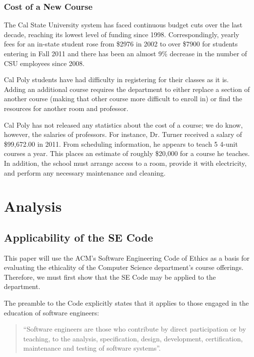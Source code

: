 \documentclass[11pt]{article}
\begin{document}
\begin{multicols}{2}
\subsubsection{Cost of a New Course}

The Cal State University system has faced continuous budget cuts over the last decade, reaching its lowest level of funding since 1998. \cite{tuitonFall}  Correspondingly, yearly fees for an in-state student rose from \$2976 in 2002 to over \$7900 for students entering in Fall 2011 \cite{feeHistory} and there has been an almost 9\% decrease in the number of CSU employees since 2008. \cite{tuitonFall}

Cal Poly students have had difficulty in registering for their classes as it is. \cite{scramble}  Adding an additional course requires the department to either replace a section of another course (making that other course more difficult to enroll in) or find the resources for another room and professor.

Cal Poly has not released any statistics about the cost of a course; we do know, however, the salaries of professors.  For instance, Dr. Turner received a salary of \$99,672.00 in 2011. \cite{sacbee}  From scheduling information, he appears to teach 5 4-unit courses a year. \cite{TurnerSchedule}  This places an estimate of roughly \$20,000 for a course he teaches.  In addition, the school must arrange access to a room, provide it with electricity, and perform any necessary maintenance and cleaning.

\section{Analysis}

\subsection{Applicability of the SE Code}

This paper will use the ACM's Software Engineering Code of Ethics as a basis for evaluating the ethicality of the Computer Science department's course offerings.  Therefore, we must first show that the SE Code may be applied to the department.

The preamble to the Code explicitly states that it applies to those engaged in the education of software engineers:

\begin{quote}
``Software engineers are those who contribute by direct participation or by teaching, to the analysis, specification, design, development, certification, maintenance and testing of software systems''. \cite{secode}
\end{quote}


\end{multicols}
\end{document}
